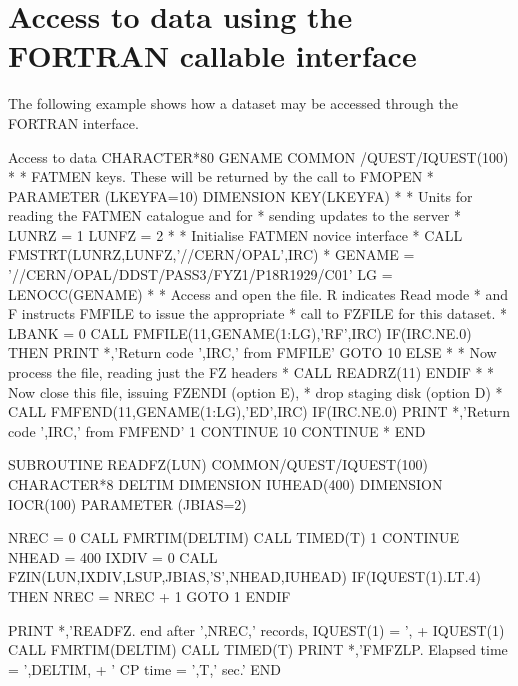 \section{Access to data using the FORTRAN callable interface}
\par
The following example shows how a dataset may be accessed
through the FORTRAN interface.
\begin{XMPt}{Access to data}
      CHARACTER*80 GENAME
      COMMON /QUEST/IQUEST(100)
*
*     FATMEN keys. These will be returned by the call to FMOPEN
*
      PARAMETER (LKEYFA=10)
      DIMENSION KEY(LKEYFA)
*
*     Units for reading the FATMEN catalogue and for
*     sending updates to the server
*
      LUNRZ = 1
      LUNFZ = 2
*    
*     Initialise FATMEN novice interface
*
      CALL FMSTRT(LUNRZ,LUNFZ,'//CERN/OPAL',IRC)
*
      GENAME = '//CERN/OPAL/DDST/PASS3/FYZ1/P18R1929/C01'
      LG = LENOCC(GENAME)
*
*     Access and open the file. R indicates Read mode
*     and F instructs FMFILE to issue the appropriate
*     call to FZFILE for this dataset.
* 
      LBANK = 0
      CALL FMFILE(11,GENAME(1:LG),'RF',IRC)
      IF(IRC.NE.0) THEN
         PRINT *,'Return code ',IRC,' from FMFILE'
         GOTO 10
      ELSE
*
*     Now process the file, reading just the FZ headers
*
         CALL READRZ(11)
      ENDIF
*
*     Now close this file, issuing FZENDI (option E),
*     drop staging disk (option D)
*
      CALL FMFEND(11,GENAME(1:LG),'ED',IRC)
      IF(IRC.NE.0) PRINT *,'Return code ',IRC,' from FMFEND'
1     CONTINUE
10    CONTINUE
*
      END
 
      SUBROUTINE READFZ(LUN)
      COMMON/QUEST/IQUEST(100)
      CHARACTER*8  DELTIM
      DIMENSION    IUHEAD(400)
      DIMENSION    IOCR(100)
      PARAMETER (JBIAS=2)
 
      NREC = 0
      CALL FMRTIM(DELTIM)
      CALL TIMED(T)
   1  CONTINUE
      NHEAD = 400
      IXDIV = 0
      CALL FZIN(LUN,IXDIV,LSUP,JBIAS,'S',NHEAD,IUHEAD)
      IF(IQUEST(1).LT.4) THEN
         NREC = NREC + 1
         GOTO 1
      ENDIF
 
      PRINT *,'READFZ. end after ',NREC,' records, IQUEST(1) = ',
     +        IQUEST(1)
      CALL FMRTIM(DELTIM)
      CALL TIMED(T)
      PRINT *,'FMFZLP. Elapsed time = ',DELTIM,
     +        ' CP time = ',T,' sec.'
      END
 
 
\end{XMPt}
